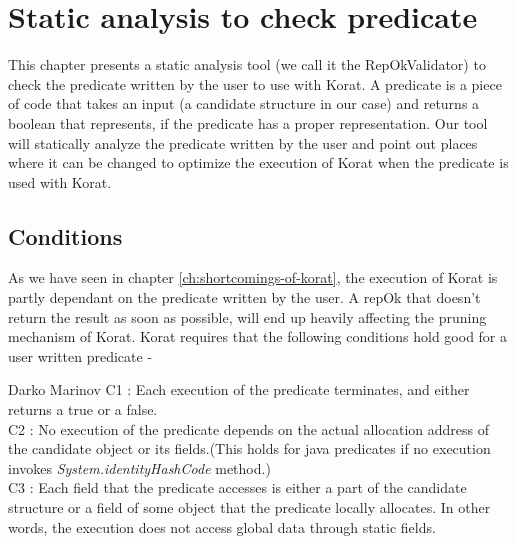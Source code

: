 \chapter{Static analysis to check predicate}
\label{ch:static-analysis}
This chapter presents a static analysis tool (we call it the RepOkValidator) to check the predicate written by the user to use with Korat. A predicate is a piece of code that takes an input (a candidate structure in our case) and returns a boolean that represents, if the predicate has a proper representation. Our tool will statically analyze the predicate written by the user and point out places where it can be changed to optimize the execution of Korat when the predicate is used with Korat.

\section{Conditions}
\label{sec:static-analysis-conditions}
As we have seen in chapter \ref{ch:shortcomings-of-korat}, the execution of Korat is partly dependant on the predicate written by the user. A repOk that doesn’t return the result as soon as possible, will end up heavily affecting the pruning mechanism of Korat. Korat requires\cite{marinov2005automatic} that the following conditions hold good for a user written predicate - 

\begin{aquote}{Darko Marinov}
C1 : Each execution of the predicate terminates, and either returns a true or a false.\\
C2 : No execution of the predicate depends on the actual allocation address of the candidate object or its fields.(This holds for java predicates if no execution invokes \emph{System.identityHashCode} method.)\\
C3 : Each field that the predicate accesses is either a part of the candidate structure or a field of some object that the predicate locally allocates. In other words, the execution does not access global data through static fields.\\
\end{aquote}

